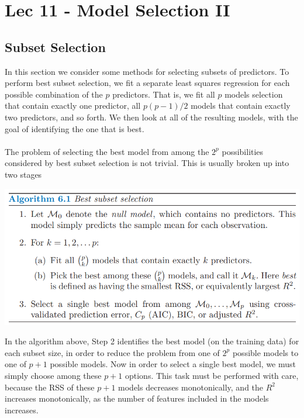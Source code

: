 \chapter{Lec 11 - Model Selection II}

\maketitle

\section{Subset Selection}
In this section we consider some methods for selecting subsets of predictors. To perform best subset selection, we fit a separate least squares regression for each possible combination of the $p$ predictors. That is, we fit all $p$ models selection that contain exactly one predictor, all $p(p-1)/2$ models that contain
exactly two predictors, and so forth. We then look at all of the resulting models, with the goal of identifying the one that is best.\\\\
The problem of selecting the best model from among the $2^p$ possibilities
considered by best subset selection is not trivial. This is usually broken up
into two stages
\begin{center}
    \includegraphics[scale=0.7]{images/best-subset.png}
\end{center}
In the algorithm above, Step 2 identifies the best model (on the training data)
for each subset size, in order to reduce the problem from one of $2^p$ possible models to one of $p + 1$ possible models. Now in order to select a single best model, we must simply choose among these $p + 1$ options. This task must be performed with care, because the RSS of these $p + 1$ models decreases monotonically, and the $R^2$ increases monotonically, as the number of features included in the models increases.\\\\

